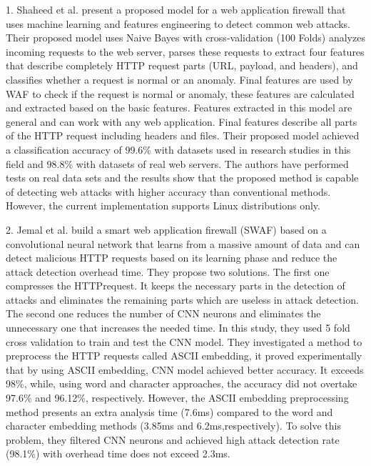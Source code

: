 1.	Shaheed et al. \cite{Shaheed} present a proposed model for a web application firewall that uses machine learning and features engineering to detect common web attacks. Their proposed model uses Naive Bayes with cross-validation (100 Folds) analyzes incoming requests to the web server, parses these requests to extract four features that describe completely HTTP request parts (URL, payload, and headers), and classifies whether a request is normal or an anomaly. Final features are used by WAF to check if the request is normal or anomaly, these features are calculated and extracted based on the basic features. Features extracted in this model are general and can work with any web application. Final features describe all parts of the HTTP request including headers and files. Their proposed model achieved a classification accuracy of 99.6\% with datasets used in research studies in this field and 98.8\% with datasets of real web servers. The authors have performed tests on real data sets and the results show that the proposed method is capable of detecting web attacks with higher accuracy than conventional methods. However, the current implementation supports Linux distributions only. 

2.	Jemal et al. \cite{Jemal} build a smart web application ﬁrewall (SWAF) based on a convolutional neural network that learns from a massive amount of data and can detect malicious HTTP requests based on its learning phase and reduce the attack detection overhead time. They propose two solutions. The ﬁrst one compresses the HTTPrequest. It keeps the necessary parts in the detection of attacks and eliminates the remaining parts which are useless in attack detection. The second one reduces the number of CNN neurons and eliminates the unnecessary one that increases the needed time. In this study, they used 5 fold cross validation to train and test the CNN model. They investigated a method to preprocess the HTTP requests called ASCII embedding, it proved experimentally that by using ASCII embedding, CNN model achieved better accuracy. It exceeds 98\%, while, using word and character approaches, the accuracy did not overtake 97.6\% and 96.12\%, respectively. However, the ASCII embedding preprocessing method presents an extra analysis time (7.6ms) compared to the word and character embedding methods (3.85ms and 6.2ms,respectively). To solve this problem, they filtered CNN neurons and achieved high attack detection rate (98.1\%) with overhead time does not exceed 2.3ms.

